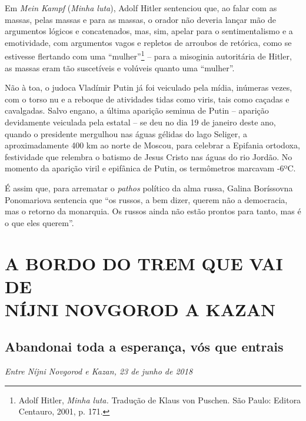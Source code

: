 Em \emph{Mein Kampf} (\emph{Minha luta}), Adolf Hitler sentenciou que,
ao falar com as massas, pelas massas e para as massas, o orador não
deveria lançar mão de argumentos lógicos e concatenados, mas, sim,
apelar para o sentimentalismo e a emotividade, com argumentos vagos e
repletos de arroubos de retórica, como se estivesse flertando com uma
``mulher''\footnote{Adolf Hitler, \emph{Minha luta.} Tradução de Klaus
  von Puschen. São Paulo: Editora Centauro, 2001, p. 171.} -- para a
misoginia autoritária de Hitler, as massas eram tão suscetíveis e
volúveis quanto uma ``mulher''.

Não à toa, o judoca Vladímir Putin já foi veiculado pela mídia, inúmeras
vezes, com o torso nu e a reboque de atividades tidas como viris, tais
como caçadas e cavalgadas. Salvo engano, a última aparição seminua de
Putin -- aparição devidamente veiculada pela  estatal -- se deu no dia
19 de janeiro deste ano, quando o presidente mergulhou nas águas gélidas
do lago Seliger, a aproximadamente 400 km ao norte de Moscou, para
celebrar a Epifania ortodoxa, festividade que relembra o batismo de
Jesus Cristo nas águas do rio Jordão. No momento da aparição viril e
epifânica de Putin, os termômetros marcavam -6ºC.

É assim que, para arrematar o \emph{pathos} político da alma russa,
Galina Boríssovna Ponomariova sentencia que ``os russos, a bem dizer,
querem não a democracia, mas o retorno da monarquia. Os russos ainda não
estão prontos para tanto, mas é o que eles querem''.

\clearpage{\pagestyle{empty}\cleardoublepage}
\movetooddpage
{}
\part*{A BORDO DO TREM QUE VAI DE\\NÍJNI NOVGOROD A KAZAN}

\chapter*{Abandonai toda a esperança, vós que entrais}

\begin{flushright}
\emph{Entre Níjni Novgorod e Kazan, 23 de junho de 2018}
\end{flushright}


